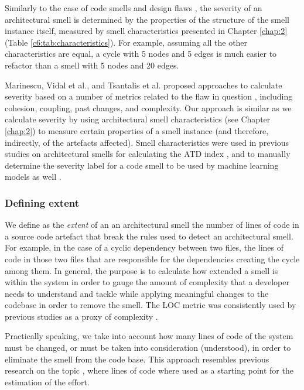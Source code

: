 Similarly to the case of code smells \cite{Arcelli2017b, Arcelli2015b} and design flaws \cite{Marinescu2012}, the severity of an architectural smell is determined by the properties of the structure of the smell instance itself, measured by smell characteristics presented in Chapter \ref{chap:2} (Table \ref*{c6:tab:characteristics}).
For example, assuming all the other characteristics are equal, a cycle with 5 nodes and 5 edges is much easier to refactor than a smell with 5 nodes and 20 edges.

Marinescu, Vidal et al., and Tsantalis et al. proposed approaches to calculate severity based on a number of metrics related to the flaw in question \cite{Marinescu2012, Vidal2016,Tsantalis2011}, including cohesion, coupling, past changes, and complexity.
Our approach is similar as we calculate severity by using architectural smell characteristics (see Chapter \ref{chap:2}) to measure certain properties of a smell instance (and therefore, indirectly, of the artefacts affected).
Smell characteristics were used in previous studies on architectural smells for calculating the ATD index  \cite{Roveda2018}, and to manually determine the severity label for a code smell to be used by machine learning models as well \cite{Arcelli2017b}.

\subsubsection{Defining extent}\label{c6:sec:approach-extent}
We define as the \emph{extent} of an an architectural smell the number of lines of code in a source code artefact that break the rules used to detect an architectural smell.
For example, in the case of a cyclic dependency between two files, the lines of code in those two files that are responsible for the dependencies creating the cycle among them.
In general, the purpose is to calculate how extended a smell is within the system in order to gauge the amount of complexity that a developer needs to understand and tackle while applying meaningful changes to the codebase in order to remove the smell.
The LOC metric was consistently used by previous studies as a proxy of complexity \cite{Morasca2001, Kitchenham2004, Morozoff2010}.%

Practically speaking, we take into account how many lines of code of the system must be changed, or must be taken into consideration (understood), in order to eliminate the smell from the code base.
This approach resembles previous research on the topic \cite{Nugroho2011}, where lines of code where used as a starting point for the estimation of the effort.

